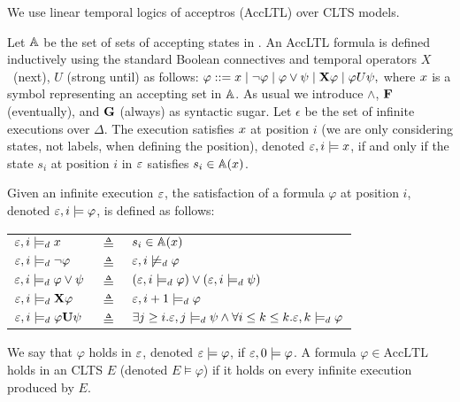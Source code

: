 
We use linear temporal logics of acceptros (AccLTL) over CLTS models. %

Let $\mathbb{A}$ be the set of sets of accepting states in \cltsDef. 
An AccLTL formula is defined inductively using the standard Boolean connectives and temporal operators $X$~(next), $U$ (strong until) as follows: 
$\varphi ::= x \mid \neg \varphi \mid \varphi \vee \psi \mid {\bf X} \varphi \mid \varphi U \psi,$
where $x$ is a symbol representing an accepting set in $\mathbb{A}$. 
As usual we introduce $\wedge$, ${\bf F}$ (eventually), and ${\bf G}$ (always) as syntactic sugar. 
Let $\epsilon$ be the set of infinite executions over $\Delta$.
The execution \executionDef satisfies $x$ at position $i$ (we are only considering states, not labels, when defining the position), denoted $\varepsilon,i \models x$, if and only if the state $s_i$ at position $i$ in $\varepsilon$  satisfies $s_i \in \mathbb{A}(x)$.


Given an infinite execution $\varepsilon$, the satisfaction of a formula $\varphi$ at position $i$, denoted $\varepsilon,i\models\varphi$, is defined as follows:

\begin{tabular}{ l c l }
$\varepsilon, i \models_d x$ & $\triangleq$ & $s_i \in \mathbb{A}(x)$\\
$\varepsilon, i \models_d \neg \varphi$ & $\triangleq$ & $\varepsilon, i \not\models_d \varphi$\\
$\varepsilon, i \models_d \varphi \vee \psi$ & $\triangleq$ & $(\varepsilon, i \models_d \varphi) \vee (\varepsilon, i \models_d \psi)$\\
$\varepsilon, i \models_d {\bf X} \varphi$ & $\triangleq$ & $\varepsilon, i +1 \models_d \varphi$\\
$\varepsilon, i \models_d \varphi {\bf U} \psi$ & $\triangleq$ & $\exists j \geq i . \varepsilon,j \models_d \psi \wedge \forall i \leq k \le k. \varepsilon, k \models_d \varphi$\\
\end{tabular}
  
We say that $\varphi$ holds in $\varepsilon$, denoted $\varepsilon\models\varphi$, if $\varepsilon,0\models\varphi$. 
A formula $\varphi \in \mbox{AccLTL}$ holds in an CLTS $E$ (denoted $E \models \varphi$) if it holds on every infinite execution produced by $E$.
